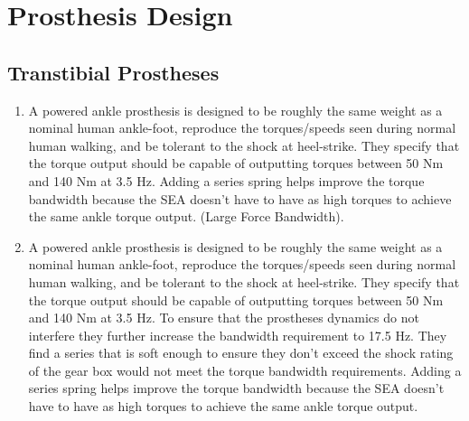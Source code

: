 \chapter{Prosthesis Design}\label{ch:Prosthesis_Design}

\section{Transtibial Prostheses}\label{sec:Transtibial_Prosthesis_Design}
\begin{enumerate} 
    \item {}


    A powered ankle prosthesis is designed to be roughly the same weight as a
    nominal human ankle-foot, reproduce the torques/speeds seen during normal
    human walking, and be tolerant to the shock at heel-strike. They specify
    that the torque output should be capable of outputting torques between 50 Nm
    and 140 Nm at 3.5 Hz. Adding a series spring helps improve the torque
    bandwidth because the SEA doesn't have to have as high torques to achieve
    the same ankle torque output. (Large Force Bandwidth).

    \item {}


    A powered ankle prosthesis is designed to be roughly the same weight as a
    nominal human ankle-foot, reproduce the torques/speeds seen during normal
    human walking, and be tolerant to the shock at heel-strike. They specify
    that the torque output should be capable of outputting torques between 50 Nm
    and 140 Nm at 3.5 Hz. To ensure that the prostheses dynamics do not
    interfere they further increase the bandwidth requirement to 17.5 Hz. They
    find a series that is soft enough to ensure they don't exceed the shock
    rating of the gear box would not meet the torque bandwidth requirements.
    Adding a series spring helps improve the torque bandwidth because the SEA
    doesn't have to have as high torques to achieve the same ankle torque
    output.


\end{enumerate}
